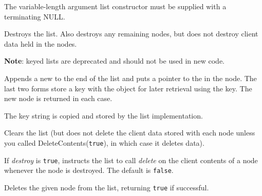 The variable-length argument list constructor must be supplied with a
terminating NULL.

\label{wxlistdtor}


Destroys the list.  Also destroys any remaining nodes, but does not destroy
client data held in the nodes.

\label{wxlistappend}


{\bf Note}: keyed lists are deprecated and should not be used in new code.



Appends a new  to the end of the list and puts a
pointer to the  in the node.  The last two forms store a key
with the object for later retrieval using the key. The new node is returned in
each case.

The key string is copied and stored by the list implementation.

\label{wxlistclear}


Clears the list (but does not delete the client data stored with each node
unless you called DeleteContents({\tt true}), in which case it deletes data).

\label{wxlistdeletecontents}


If {\it destroy} is {\tt true}, instructs the list to call {\it delete} on the client contents of
a node whenever the node is destroyed. The default is {\tt false}.

\label{wxlistdeletenode}


Deletes the given node from the list, returning {\tt true} if successful.

\label{wxlistdeleteobject}


